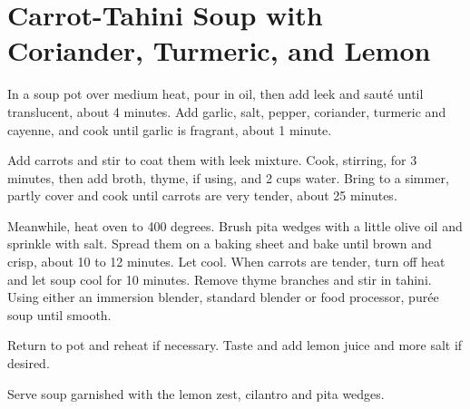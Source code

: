 \section{Carrot-Tahini Soup with Coriander, Turmeric, and Lemon}
\begin{recipe}
	
	
	

In a soup pot over medium heat, pour in oil, then add leek and sauté until translucent, about 4 minutes. Add garlic, salt, pepper, coriander, turmeric and cayenne, and cook until garlic is fragrant, about 1 minute.

Add carrots and stir to coat them with leek mixture. Cook, stirring, for 3 minutes, then add broth, thyme, if using, and 2 cups water. Bring to a simmer, partly cover and cook until carrots are very tender, about 25 minutes.

Meanwhile, heat oven to 400 degrees. Brush pita wedges with a little olive oil and sprinkle with salt. Spread them on a baking sheet and bake until brown and crisp, about 10 to 12 minutes. Let cool.
When carrots are tender, turn off heat and let soup cool for 10 minutes. Remove thyme branches and stir in tahini. Using either an immersion blender, standard blender or food processor, purée soup until smooth. 

Return to pot and reheat if necessary. Taste and add lemon juice and more salt if desired.

Serve soup garnished with the lemon zest, cilantro and pita wedges.


	
\end{recipe}
